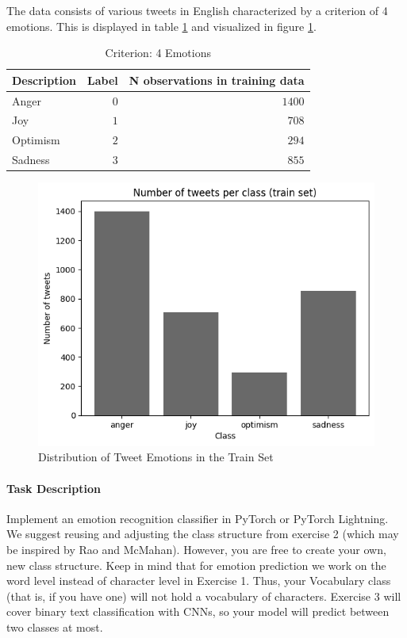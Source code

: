 \documentclass[fleqn,10pt]{SelfArx} %
\begin{document}
The data consists of various tweets in English characterized by a criterion of 4 emotions. This is displayed in table \ref{tab:emotable} and visualized in figure \ref{fig:n_emotions}.

\begin{table}[hbt]
	\centering
	\begin{tabular}{lrr}
		\toprule
		Description & Label & N observations in training data \\
		\midrule
		  Anger & $0$ & $1400$ \\
        Joy & $1$ & $708$ \\
        Optimism & $2$ & $294$ \\
		  Sadness & $3$ & $855$ \\
		\bottomrule
	\end{tabular}
	\caption{Criterion: 4 Emotions}
	\label{tab:emotable}
\end{table}

\begin{figure}[ht]\centering
	\includegraphics[width=\linewidth]{Figures/number_of_classes.png}
	\caption{Distribution of Tweet Emotions in the Train Set}
	\label{fig:n_emotions}
\end{figure}

\paragraph{Task Description}
Implement an emotion recognition classifier in PyTorch or PyTorch Lightning. We suggest reusing and adjusting the class structure from exercise 2 (which may be inspired by Rao and McMahan). However, you are free to create your own, new class structure. Keep in mind that for emotion prediction we work on the word level instead of character level in Exercise 1. Thus, your Vocabulary class (that is, if you have one) will not hold a vocabulary of characters. Exercise 3 will cover binary text classification with CNNs, so your model will predict between two classes at most.
\end{document}
